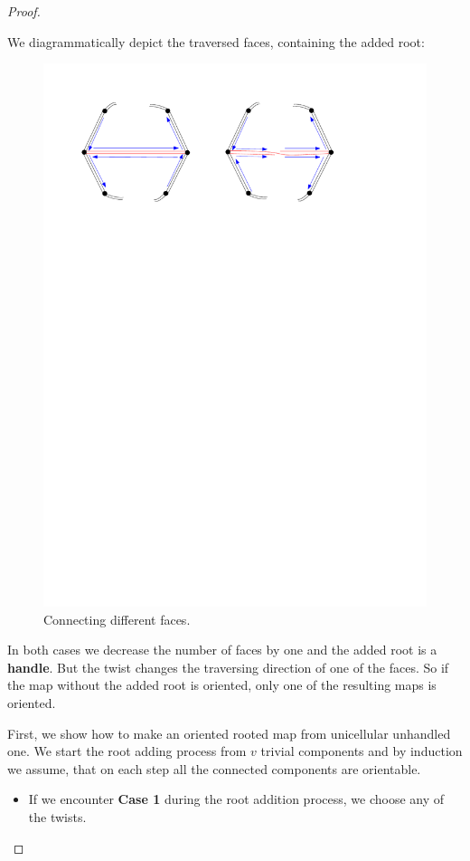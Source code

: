 \documentclass{article}
\begin{document}
\begin{proof}
\begin{itemize}
		We diagrammatically depict the traversed faces, containing the added root:
		
		\begin{figure}[H]
			\includegraphics[scale=0.4]{connecting_corners_of_one_face}
			\centering
			\caption{Connecting different faces.}			
		\end{figure}
		
		In both cases we decrease the number of faces by one and the added root is a \textbf{handle}. But the twist changes the traversing direction of one of the faces. So if the map without the added root is oriented, only one of the resulting maps is oriented.
	\end{itemize}

	First, we show how to make an oriented rooted map from unicellular unhandled one. We start the root adding process from $v$ trivial components and by induction we assume, that on each step all the connected components are orientable.
	\begin{itemize}
		\item If we encounter \textbf{Case 1} during the root addition process, we choose any of the twists.
		

\end{itemize}
\end{proof}
\end{document}
